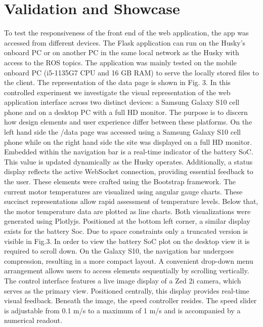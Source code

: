 \documentclass[conference]{IEEEtran}
\begin{document}
\section{Validation and Showcase}\label{VS}
To test the responsiveness of the front end of the web application, the app was accessed from different devices. The Flask application can run on the Husky's onboard PC or on another PC in the same local network as the Husky with access to the ROS topics. The application was mainly tested on the mobile onboard PC (i5-1135G7 CPU and 16 GB RAM) to serve the locally stored files to the client.
The representation of the data page is shown in Fig. 3. 
In this controlled experiment we investigate the visual representation of the web application interface across two distinct devices: a Samsung Galaxy S10 cell phone and on a desktop PC with a full HD monitor. The purpose is to discern how design elements and user experience differ between these platforms.
On the left hand side the /data page was accessed using a Samsung Galaxy S10 cell phone while on the right hand side the site was displayed on a full HD monitor.
Embedded within the navigation bar is a real-time indicator of the battery SoC. This value is updated dynamically as the Husky operates.
Additionally, a status display reflects the active WebSocket connection, providing essential feedback to the user.
These elements were crafted using the Bootstrap framework. The current motor temperatures are visualized using angular gauge charts. These succinct representations allow rapid assessment of temperature levels.
Below that, the motor temperature data are plotted as line charts. Both visualizations were generated using Plotlyjs.
Positioned at the bottom left corner, a similar display exists for the battery Soc. Due to space constraints only a truncated version is visible in Fig.3. In order to view the battery SoC plot on the desktop view it is required to scroll down. 
On the Galaxy S10, the navigation bar undergoes compression, resulting in a more compact layout.
A convenient drop-down menu arrangement allows users to access elements sequentially by scrolling vertically.
The control interface features a live image display of a Zed 2i camera, which serves as the primary view. Positioned centrally, this display provides real-time visual feedback. Beneath the image, the speed controller resides. The speed slider is adjustable from 0.1 m/s to a maximum of 1 m/s and is accompanied by a numerical readout.
\end{document}
